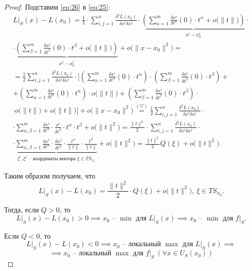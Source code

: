 \begin{proof}
    Подставим \ref{eq:26} в \ref{eq:25}:
    \begin{multline*}
        L\big|_S(x) - L(x_0) = \frac{1}{2}\cdot\sum_{i,j=1}^{n}\frac{\delta^2L(x_0)}{\delta x^i \delta x^j} \cdot \underbrace{\left(\sum_{\alpha=1}^{m}\frac{\delta x^i}{\delta t^\alpha}(0)\cdot t^\alpha + o\big(\|t\|\big)\right)}_{x^i - x_0^i}\cdot \\
        \cdot \underbrace{\left(\sum_{\beta=1}^{m}\frac{\delta x^j}{\delta t^\beta}(0)\cdot t^\beta + o\big(\|t\|\big)\right)}_{x^j - x_0^j} + o\big(\|x-x_0\|^2\big) = \\
        = \frac{1}{2}\sum_{i,j=1}^{n}\frac{\delta^2 L(x_0)}{\delta x^i \delta x^j}\cdot\Bigg[\left(\sum_{\alpha=1}^{m}\frac{\delta x^i}{\delta t^\alpha}(0)\cdot t^\alpha\right)\cdot\left(\sum_{\beta=1}^{m}\frac{\delta x^i}{\delta t^\beta}(0)\cdot t^\beta\right) + \\
            + \left(\sum_{\alpha=1}^{m}\frac{\delta x^i}{\delta t^\alpha}(0)\cdot t^\alpha\right)\cdot o\big(\|t\|\big) + \left(\sum_{\beta=1}^{m}\frac{\delta x^i}{\delta t^\beta}(0)\cdot t^\beta\right)\cdot \\
            \cdot o\big(\|t\|\big) + o\big(\|t\|\big)\Bigg] + o\big(\|x-x_0\|^2\big) \overset{(\heartsuit)}{=} \frac{1}{2}\sum_{i,j=1}^{n}\frac{\delta^2 L(x_0)}{\delta x^i \delta x^j} \cdot \\
        \cdot \sum_{\alpha,\beta = 1}^{m}\frac{\delta x^i}{\delta t^\alpha} \cdot \frac{x^i}{\delta t^\beta} \cdot t^\alpha \cdot t^\beta + o\big(\|t\|^2\big) = \frac{\|t\|^2}{2} \cdot \sum_{i,j=1}^{n}\frac{\delta^2 L(x_0)}{\delta x^i\delta x^j} \cdot \\
        \cdot \underbrace{\sum_{\alpha,\beta=1}^{m}\frac{\delta x^i}{\delta t^\alpha}\cdot \frac{\delta x^j}{\delta t^\beta} \cdot \frac{t^\alpha}{\|t\|} \cdot \frac{t^\beta}{\|t\|}}_{\xi^i,\xi^j\text{ -- координаты вектора }\xi\in TS_{x_0}} + o\big(\|t\|^2\big) = \frac{\|t\|^2}{2}Q(\xi) + o\big(\|t\|^2\big).
    \end{multline*}

    Таким образом получаем, что
    \[
        L\big|_S(x) - L(x_0) = \frac{\|t\|^2}{2} \cdot Q(\xi) + o\big(\|t\|^2\big), \ \xi \in TS_{x_0}.
    \]

    Тогда, если $Q> 0$, то
    \[
        L\big|_S(x) - L(x_0)> 0 \implies x_0 \text{ -- } \min \text{ для } L\big|_S(x) \implies x_0 \text{ -- } \min \text{ для } f\big|_S.
    \]

    Если $Q < 0$, то
    \[
        L\big|_S(x) - L(x_0) < 0 \implies x_0 \text{ -- локальный } \max \text{ для } L\big|_S(x) \implies
    \]
    \[
        \implies x_0 \text{ -- локальный } \max \text{ для } f\big|_S \ (\forall x \in U_S(x_0))
    \]


\end{proof}
